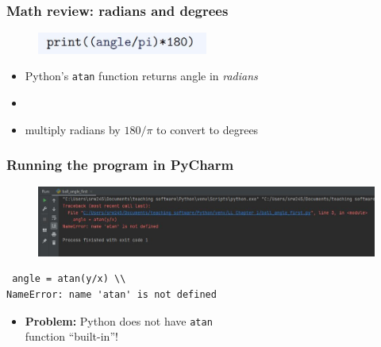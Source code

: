 \documentclass[14pt]{beamer}
\begin{document}

\begin{frame}[fragile]
\frametitle{Math review: radians and degrees}

\begin{figure}[ht]
	\centering
	\includegraphics[width=0.5\textwidth]{figures/LLp12b}
\end{figure}

\begin{itemize}
\item Python's \texttt{atan} function returns angle in \emph{radians}
\item[]
\item multiply radians by $180/\pi$ to convert to degrees
\end{itemize}
\end{frame}


\begin{frame}[fragile]

\frametitle{Running the program in PyCharm}

\begin{figure}[ht]
	\centering
	\includegraphics[width=\textwidth]{figures/LLp12output}
\end{figure}

\begin{verbatim}
 angle = atan(y/x) \\
NameError: name 'atan' is not defined
\end{verbatim}

\begin{itemize}
\item \textbf{Problem:} Python does not have \texttt{atan} \\ \qquad\qquad\quad function ``built-in''!
\end{itemize}

\end{frame}

\end{document}
